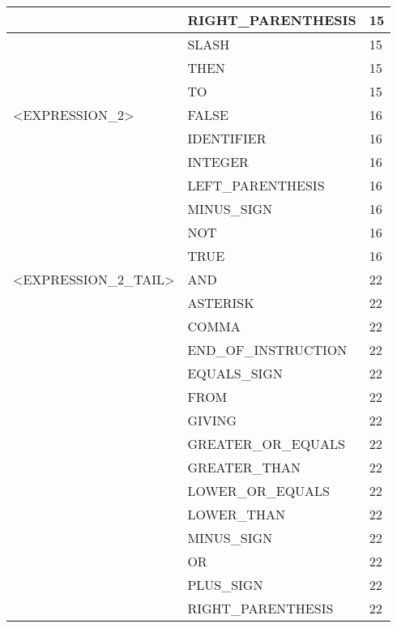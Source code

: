 \begin{longtable}{|l|l|l|}
                     &   RIGHT\_PARENTHESIS    &   15 \\ \hline
                     &   SLASH                &   15 \\ \hline
                     &   THEN                 &   15 \\ \hline
                     &   TO                   &   15 \\ \hline
<EXPRESSION\_2>      &   FALSE                &   16 \\ \hline
                     &   IDENTIFIER           &   16 \\ \hline
                     &   INTEGER              &   16 \\ \hline
                     &   LEFT\_PARENTHESIS     &   16 \\ \hline
                     &   MINUS\_SIGN           &   16 \\ \hline
                     &   NOT                  &   16 \\ \hline
                     &   TRUE                 &   16 \\ \hline
<EXPRESSION\_2\_TAIL>&   AND                  &   22 \\ \hline
                     &   ASTERISK             &   22 \\ \hline
                     &   COMMA                &   22 \\ \hline
                     &   END\_OF\_INSTRUCTION   &   22 \\ \hline
                     &   EQUALS\_SIGN          &   22 \\ \hline
                     &   FROM                 &   22 \\ \hline
                     &   GIVING               &   22 \\ \hline
                     &   GREATER\_OR\_EQUALS    &   22 \\ \hline
                     &   GREATER\_THAN         &   22 \\ \hline
                     &   LOWER\_OR\_EQUALS      &   22 \\ \hline
                     &   LOWER\_THAN           &   22 \\ \hline
                     &   MINUS\_SIGN           &   22 \\ \hline
                     &   OR                   &   22 \\ \hline
                     &   PLUS\_SIGN            &   22 \\ \hline
                     &   RIGHT\_PARENTHESIS    &   22 \\ \hline

\end{longtable}
